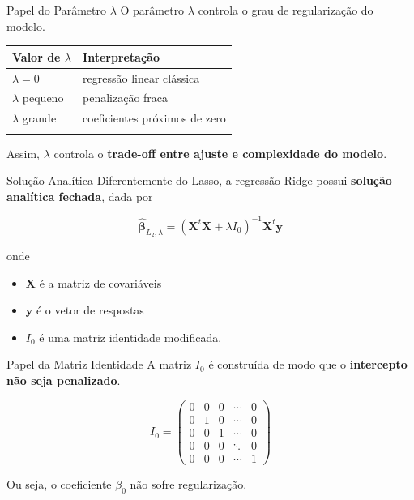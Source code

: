 \documentclass[
  ignorenonframetext,
  aspectratio=169,
]{beamer}
\providecommand{\tightlist}{%
  \setlength{\itemsep}{0pt}\setlength{\parskip}{0pt}}
\begin{document}
\begin{frame}
\begin{block}{Papel do Parâmetro \(\lambda\)}
\label{papel-do-paruxe2metro-lambda}
O parâmetro \(\lambda\) controla o grau de regularização do modelo.

\begin{longtable}[]{@{}ll@{}}
\toprule\noalign{}
Valor de \(\lambda\) & Interpretação \\
\midrule\noalign{}
\endhead
\(\lambda = 0\) & regressão linear clássica \\
\(\lambda\) pequeno & penalização fraca \\
\(\lambda\) grande & coeficientes próximos de zero \\
\bottomrule\noalign{}
\end{longtable}

Assim, \(\lambda\) controla o \textbf{trade-off entre ajuste e
complexidade do modelo}.
\end{block}
\end{frame}

\begin{frame}
\begin{block}{Solução Analítica}
\label{soluuxe7uxe3o-analuxedtica}
Diferentemente do Lasso, a regressão Ridge possui \textbf{solução
analítica fechada}, dada por

\[
\hat{\boldsymbol{\beta}}_{L_2,\lambda}
=
(\boldsymbol{X}^t \boldsymbol{X} + \lambda I_0)^{-1}\boldsymbol{X}^t\boldsymbol{y}
\]

onde

\begin{itemize}
\tightlist
\item
  \(\boldsymbol{X}\) é a matriz de covariáveis
\item
  \(\boldsymbol{y}\) é o vetor de respostas
\item
  \(I_0\) é uma matriz identidade modificada.
\end{itemize}
\end{block}
\end{frame}

\begin{frame}
\begin{block}{Papel da Matriz Identidade}
\label{papel-da-matriz-identidade}
A matriz \(I_0\) é construída de modo que o \textbf{intercepto não seja
penalizado}.

\[
I_0 =
\begin{pmatrix}
0 & 0 & 0 & \cdots & 0 \\
0 & 1 & 0 & \cdots & 0 \\
0 & 0 & 1 & \cdots & 0 \\
0 & 0 & 0 & \ddots & 0 \\
0 & 0 & 0 & \cdots & 1
\end{pmatrix}
\]

Ou seja, o coeficiente \(\beta_0\) não sofre regularização.
\end{block}
\end{frame}
\end{document}

